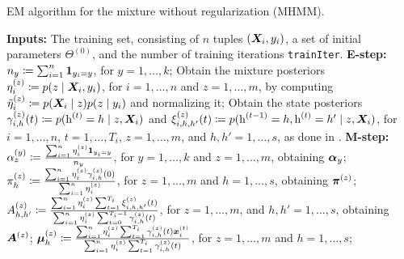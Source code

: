 \begin{algorithm}
    \caption{EM algorithm for the mixture without regularization (MHMM).}
    \label{alg:mhmm}
    \begin{algorithmic}[1]
        \State \textbf{Inputs:} The training set, consisting of $n$ tuples $({\bm{X}}_i,y_i)$, a set of initial parameters $\Theta^{(0)}$, and the number of training iterations \texttt{trainIter}.
        \vspace{0.3cm}
        \vspace{0.3cm}
        \State \textbf{E-step:}
        \vspace{0.3cm}
        \Indent
        \State $n_y \coloneqq \sum_{i=1}^n \bm{1}_{y_i=y}$, for $y=1,\dots,k$;
        \vspace{0.3cm}
        \State Obtain the mixture posteriors $\eta^{(z)}_{i} \coloneqq p(z \mid {\bm{X}}_i, y_i)$, for $i=1,\dots,n$ and $z=1,\dots,m$, by computing  $\tilde{\eta}^{(z)}_{i} \coloneqq p({\bm{X}}_i \mid z)p(z \mid y_i)$ and normalizing it;
        \vspace{0.3cm}
        \State Obtain the state posteriors $\gamma^{(z)}_{i,h}(t) \coloneqq p({\textnormal{h}}^{(t)}=h \mid z, {\bm{X}}_i)$ and $\xi^{(z)}_{i,h,h'}(t) \coloneqq p({\textnormal{h}}^{(t-1)}=h, {\textnormal{h}}^{(t)}=h' \mid z, {\bm{X}}_i)$, for $i=1,\dots,n$, $t=1,\dots,T_i$, $z=1,\dots,m$, and $h,h'=1,\dots,s$, as done in .
        \vspace{0.3cm}
        \EndIndent
        \State \textbf{M-step:}
        \vspace{0.3cm}
        \Indent
        \State ${\alpha}^{(y)}_{z} \coloneqq \frac{\sum_{i=1}^n \eta^{(z)}_{i} \bm{1}_{y_i=y}}{n_y}$, for $y=1,\dots,k$ and $z=1,\dots,m$, obtaining ${\bm{\alpha}}_y$;
        \vspace{0.3cm}
        \State ${\pi}^{(z)}_h \coloneqq \frac{\sum_{i=1}^n \eta^{(z)}_{i} \gamma^{(z)}_{i,h}(0)}{\sum_{i=1}^n \eta^{(z)}_{i}}$, for $z=1,\dots,m$ and $h=1,\dots,s$, obtaining ${\bm{\pi}}^{(z)}$;
        \vspace{0.3cm}
        \State ${A}^{(z)}_{h,h'} \coloneqq \frac{\sum_{i=1}^n \eta^{(z)}_{i} \sum_{t=1}^{T_i} \xi^{(z)}_{i,h,h'}(t)}{\sum_{i=1}^n \eta^{(z)}_{i} \sum_{t=0}^{T_i-1} \gamma^{(z)}_{i,h}(t)}$, for $z=1,\dots,m$, and $h,h'=1,\dots,s$, obtaining ${\bm{A}}^{(z)}$;
        \vspace{0.3cm}
        \State ${\bm{\mu}}^{(z)}_h \coloneqq \frac{\sum_{i=1}^n \eta^{(z)}_{i} \sum_{t=1}^{T_i} \gamma^{(z)}_{i,h}(t) {\bm{x}}_i^{(t)}} {\sum_{i=1}^n \eta^{(z)}_{i} \sum_{t=1}^{T_i} \gamma^{(z)}_{i,h}(t)}$, for $z=1,\dots,m$ and $h=1,\dots,s$;

\end{algorithmic}
\end{algorithm}
